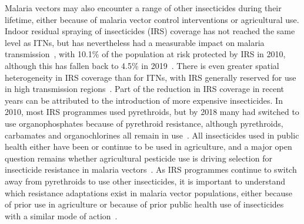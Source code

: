 \documentclass[a4paper,11pt,abstracton,hidelinks]{scrartcl}
\begin{document}
Malaria vectors may also encounter a range of other insecticides during their lifetime, either because of malaria vector control interventions or agricultural use.
%
Indoor residual spraying of insecticides (IRS) coverage has not reached the same level as ITNs, but has nevertheless had a measurable impact on malaria transmission~\parencite{Bhatt2015}, with 10.1\% of the population at risk protected by IRS in 2010, although this has fallen back to 4.5\% in 2019~\parencite{WHO2019WMR}.
%
There is even greater spatial heterogeneity in IRS coverage than for ITNs, with IRS generally reserved for use in high transmission regions~\parencite{WHO2019WMR}.
%
Part of the reduction in IRS coverage in recent years can be attributed to the introduction of more expensive insecticides.
%
In 2010, most IRS programmes used pyrethroids, but by 2018 many had switched to use organophosphates because of pyrethroid resistance, although pyrethroids, carbamates and organochlorines all remain in use~\parencite{WHO2019WMR}.
%
All insecticides used in public health either have been or continue to be used in agriculture, and a major open question remains whether agricultural pesticide use is driving selection for insecticide resistance in malaria vectors~\parencite{Georghiou1990,Nkya2013,Philbert2014,Reid2016}.
%
As IRS programmes continue to switch away from pyrethroids to use other insecticides, it is important to understand which resistance adaptations exist in malaria vector populations, either because of prior use in agriculture or because of prior public health use of insecticides with a similar mode of action~\parencite{Fouet2020}.
\end{document}
